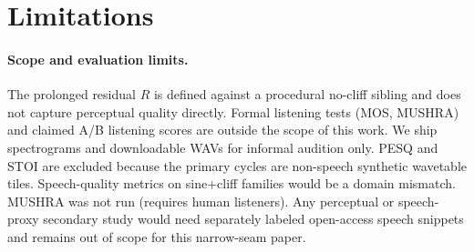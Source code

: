\section{Limitations}
\label{sec:limitations}

\paragraph{Scope and evaluation limits.}
The prolonged residual $R$ is defined against a procedural no-cliff sibling and does not capture perceptual quality directly.
Formal listening tests (MOS, MUSHRA) and claimed A/B listening scores are outside the scope of this work.
We ship spectrograms and downloadable WAVs for informal audition only.
PESQ and STOI are excluded because the primary cycles are non-speech synthetic wavetable tiles.
Speech-quality metrics on sine{+}cliff families would be a domain mismatch.
MUSHRA was not run (requires human listeners).
Any perceptual or speech-proxy secondary study would need separately labeled open-access speech snippets and remains out of scope for this narrow-seam paper.

